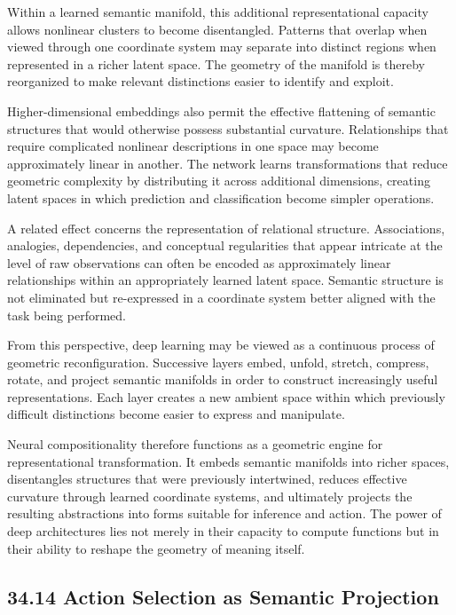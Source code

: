 \documentclass[12pt,letterpaper]{article}
\theoremstyle{remark}
\begin{document}
Within a learned semantic manifold, this additional representational capacity allows nonlinear clusters to become disentangled. Patterns that overlap when viewed through one coordinate system may separate into distinct regions when represented in a richer latent space. The geometry of the manifold is thereby reorganized to make relevant distinctions easier to identify and exploit.

Higher-dimensional embeddings also permit the effective flattening of semantic structures that would otherwise possess substantial curvature. Relationships that require complicated nonlinear descriptions in one space may become approximately linear in another. The network learns transformations that reduce geometric complexity by distributing it across additional dimensions, creating latent spaces in which prediction and classification become simpler operations.

A related effect concerns the representation of relational structure. Associations, analogies, dependencies, and conceptual regularities that appear intricate at the level of raw observations can often be encoded as approximately linear relationships within an appropriately learned latent space. Semantic structure is not eliminated but re-expressed in a coordinate system better aligned with the task being performed.

From this perspective, deep learning may be viewed as a continuous process of geometric reconfiguration. Successive layers embed, unfold, stretch, compress, rotate, and project semantic manifolds in order to construct increasingly useful representations. Each layer creates a new ambient space within which previously difficult distinctions become easier to express and manipulate.

Neural compositionality therefore functions as a geometric engine for representational transformation. It embeds semantic manifolds into richer spaces, disentangles structures that were previously intertwined, reduces effective curvature through learned coordinate systems, and ultimately projects the resulting abstractions into forms suitable for inference and action. The power of deep architectures lies not merely in their capacity to compute functions but in their ability to reshape the geometry of meaning itself.

\subsection{34.14 Action Selection as Semantic Projection}
\end{document}
